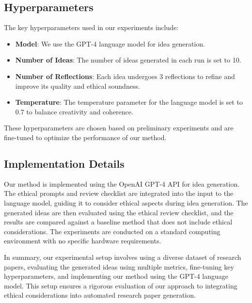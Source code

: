 \documentclass{article} %
\begin{document}
\subsection{Hyperparameters}
The key hyperparameters used in our experiments include:
\begin{itemize}
    \item \textbf{Model}: We use the GPT-4 language model for idea generation.
    \item \textbf{Number of Ideas}: The number of ideas generated in each run is set to 10.
    \item \textbf{Number of Reflections}: Each idea undergoes 3 reflections to refine and improve its quality and ethical soundness.
    \item \textbf{Temperature}: The temperature parameter for the language model is set to 0.7 to balance creativity and coherence.
\end{itemize}
These hyperparameters are chosen based on preliminary experiments and are fine-tuned to optimize the performance of our method.

\subsection{Implementation Details}
Our method is implemented using the OpenAI GPT-4 API for idea generation. The ethical prompts and review checklist are integrated into the input to the language model, guiding it to consider ethical aspects during idea generation. The generated ideas are then evaluated using the ethical review checklist, and the results are compared against a baseline method that does not include ethical considerations. The experiments are conducted on a standard computing environment with no specific hardware requirements.

In summary, our experimental setup involves using a diverse dataset of research papers, evaluating the generated ideas using multiple metrics, fine-tuning key hyperparameters, and implementing our method using the GPT-4 language model. This setup ensures a rigorous evaluation of our approach to integrating ethical considerations into automated research paper generation.
\end{document}
